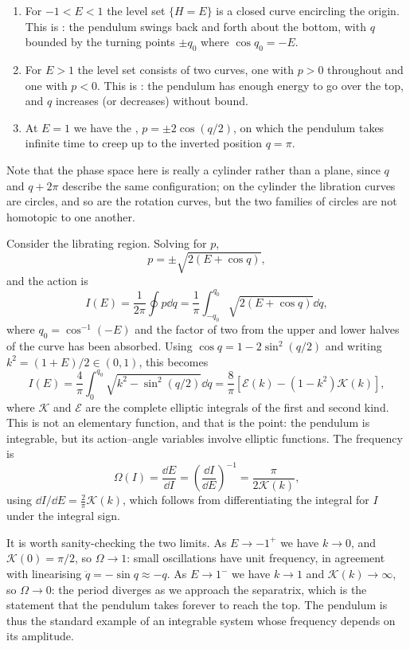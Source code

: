 \begin{example}
\begin{enumerate}[label=(\roman*)]
		\item For $-1 < E < 1$ the level set $\{H = E\}$ is a closed curve encircling the origin. This is : the pendulum swings back and forth about the bottom, with $q$ bounded by the turning points $\pm q_0$ where $\cos q_0 = -E$.
		\item For $E > 1$ the level set consists of two curves, one with $p > 0$ throughout and one with $p<0$. This is : the pendulum has enough energy to go over the top, and $q$ increases (or decreases) without bound.
		\item At $E = 1$ we have the , $p = \pm 2\cos(q/2)$, on which the pendulum takes infinite time to creep up to the inverted position $q = \pi$.
	\end{enumerate}
	Note that the phase space here is really a cylinder rather than a plane, since $q$ and $q + 2\pi$ describe the same configuration; on the cylinder the libration curves are circles, and so are the rotation curves, but the two families of circles are not homotopic to one another.

	Consider the librating region. Solving for $p$,
	$$
	p = \pm\sqrt{2(E + \cos q)},
	$$
	and the action is
	$$
	I(E) = \frac{1}{2\pi}\oint p \dd q = \frac{1}{\pi}\int_{-q_0}^{q_0}\sqrt{2(E+\cos q)}\dd q,
	$$
	where $q_0 = \cos^{-1}(-E)$ and the factor of two from the upper and lower halves of the curve has been absorbed. Using $\cos q = 1 - 2\sin^2(q/2)$ and writing $k^2 = (1+E)/2 \in (0,1)$, this becomes
	$$
	I(E) = \frac{4}{\pi}\int_0^{q_0}\sqrt{k^2 - \sin^2(q/2)}\dd q = \frac{8}{\pi}\left[\mathcal E(k) - (1-k^2)\mathcal K(k)\right],
	$$
	where $\mathcal K$ and $\mathcal E$ are the complete elliptic integrals of the first and second kind. This is not an elementary function, and that is the point: the pendulum is integrable, but its action--angle variables involve elliptic functions. The frequency is
	$$
	\Omega(I) = \frac{\dd E}{\dd I} = \left(\frac{\dd I}{\dd E}\right)^{-1} = \frac{\pi}{2\mathcal K(k)},
	$$
	using $\dd I/\dd E = \frac{2}{\pi}\mathcal{K}(k)$, which follows from differentiating the integral for $I$ under the integral sign.

	It is worth sanity-checking the two limits. As $E\to -1^+$ we have $k \to 0$, and $\mathcal K(0) = \pi/2$, so $\Omega\to 1$: small oscillations have unit frequency, in agreement with linearising $\ddot q = -\sin q \approx -q$. As $E\to 1^-$ we have $k\to 1$ and $\mathcal K(k)\to\infty$, so $\Omega\to 0$: the period diverges as we approach the separatrix, which is the statement that the pendulum takes forever to reach the top. The pendulum is thus the standard example of an integrable system whose frequency depends on its amplitude.
\end{example}

